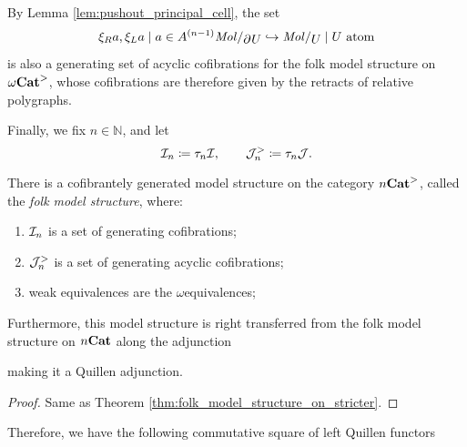 \begin{rmk} 
    By Lemma \ref{lem:pushout_principal_cell}, the set
    \begin{equation*}
        \set{\molecin{\bd{}{}U} \incl \molecin{U} \mid U \text{ atom}}
    \end{equation*}
    is also a generating set of acyclic cofibrations for the folk model structure on \( {\omega\mathbf{Cat}}^> \), whose cofibrations are therefore given by the retracts of relative polygraphs.
\end{rmk}

\noindent Finally, we fix \( n \in \mathbb{N} \), and let
\begin{equation*}
    \mathcal{I}_n \coloneqq \tau_{n}\mathcal{I},\quad\quad \mathcal{J}^>_n \coloneqq \tau_{n}\mathcal{J}.
\end{equation*}

\begin{thm} \label{thm:folk_model_structure_on_stricter_n}
    There is a cofibrantely generated model structure on the category \( {n\mathbf{Cat}}^> \), called the \emph{folk model structure}, where:
    \begin{enumerate}
        \item \( \mathcal{I}_n \) is a set of generating cofibrations;
        \item \( \mathcal{J}^>_n \) is a set of generating acyclic cofibrations;
        \item weak equivalences are the \( \omega \)\nbd equivalences;
    \end{enumerate}
    Furthermore, this model structure is right transferred from the folk model structure on \( {n\mathbf{Cat}} \) along the adjunction 
    \begin{center}
    \end{center}
    making it a Quillen adjunction.
\end{thm}
\begin{proof}
    Same as Theorem \ref{thm:folk_model_structure_on_stricter}.
\end{proof}

\noindent Therefore, we have the following commutative square of left Quillen functors
\begin{center}
\end{center}